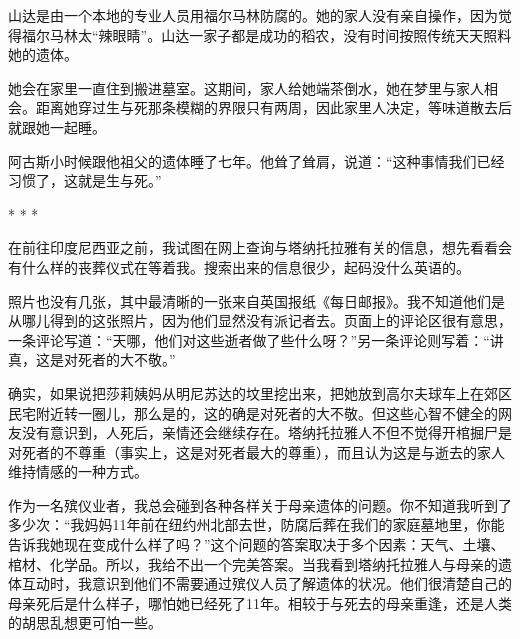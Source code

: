 \documentclass[12pt,oneside]{book}
\begin{document}
\begin{bookref}[frametitle={\cite{好好告别}}]
山达是由一个本地的专业人员用福尔马林防腐的。她的家人没有亲自操作，因为觉得福尔马林太“辣眼睛”。山达一家子都是成功的稻农，没有时间按照传统天天照料她的遗体。

她会在家里一直住到搬进墓室。这期间，家人给她端茶倒水，她在梦里与家人相会。距离她穿过生与死那条模糊的界限只有两周，因此家里人决定，等味道散去后就跟她一起睡。

阿古斯小时候跟他祖父的遗体睡了七年。他耸了耸肩，说道：“这种事情我们已经习惯了，这就是生与死。”

\begin{center}
* * *
\end{center}

在前往印度尼西亚之前，我试图在网上查询与塔纳托拉雅有关的信息，想先看看会有什么样的丧葬仪式在等着我。搜索出来的信息很少，起码没什么英语的。

照片也没有几张，其中最清晰的一张来自英国报纸《每日邮报》。我不知道他们是从哪儿得到的这张照片，因为他们显然没有派记者去。页面上的评论区很有意思，一条评论写道：“天哪，他们对这些逝者做了些什么呀？”另一条评论则写着：“讲真，这是对死者的大不敬。”

确实，如果说把莎莉姨妈从明尼苏达的坟里挖出来，把她放到高尔夫球车上在郊区民宅附近转一圈儿，那么是的，这的确是对死者的大不敬。但这些心智不健全的网友没有意识到，人死后，亲情还会继续存在。塔纳托拉雅人不但不觉得开棺掘尸是对死者的不尊重（事实上，这是对死者最大的尊重），而且认为这是与逝去的家人维持情感的一种方式。

作为一名殡仪业者，我总会碰到各种各样关于母亲遗体的问题。你不知道我听到了多少次：“我妈妈11年前在纽约州北部去世，防腐后葬在我们的家庭墓地里，你能告诉我她现在变成什么样了吗？”这个问题的答案取决于多个因素：天气、土壤、棺材、化学品。所以，我给不出一个完美答案。当我看到塔纳托拉雅人与母亲的遗体互动时，我意识到他们不需要通过殡仪人员了解遗体的状况。他们很清楚自己的母亲死后是什么样子，哪怕她已经死了11年。相较于与死去的母亲重逢，还是人类的胡思乱想更可怕一些。


\end{bookref}
\end{document}

